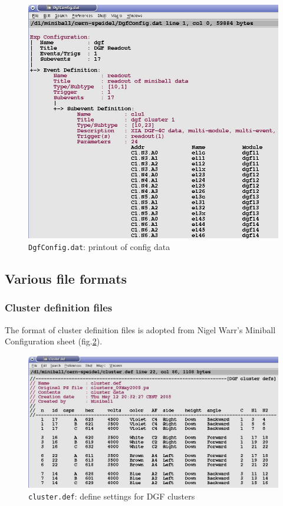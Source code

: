 \documentclass[10pt]{article}
\begin{document}
\begin{figure}[H]
\centerline{\includegraphics[width=\linewidth]{DgfConfig}}
\caption{\texttt{DgfConfig.dat}: printout of config data}
\label{DgfConfig}
\end{figure}
\newpage
\subsection{Various file formats}
\subsubsection{Cluster definition files}\label{ClusterDef}

The format of cluster definition files is adopted from Nigel Warr's Miniball Configuration sheet (fig.\ref{CluDef}).\\
\begin{figure}[H]
\centerline{\includegraphics[width=\linewidth]{ClusterDef}}
\caption{\texttt{cluster.def}: define settings for DGF clusters}
\label{CluDef}
\end{figure}
\newpage
\end{document}
